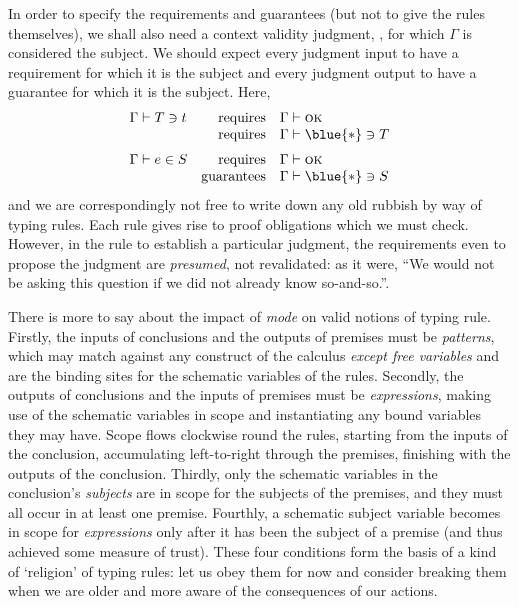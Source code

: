 \documentclass[natbib]{article}
\newcommand{\type}{\blue{\ast}}
\newcommand{\VALID}[1]{#1 \vdash \textsc{ok}}
\begin{document}
In order to specify the requirements and guarantees (but not to give the rules themselves), we shall also
need a context validity judgment, \framebox{$\VALID\Gamma$}, for which $\Gamma$ is considered the subject.
We should expect every judgment input to have a requirement for which it is the subject and every judgment output to have a guarantee for which it is the subject. Here,
\[\begin{array}{lrl}
\CHK\Gamma Tt & \mbox{requires} & \VALID\Gamma \\
              & \mbox{requires} & \CHK\Gamma \type T \medskip \\
\SYN\Gamma eS & \mbox{requires} & \VALID\Gamma \\
              & \mbox{guarantees} & \CHK\Gamma \type S
\end{array}\]
and we are correspondingly not free to write down any old rubbish by way of typing rules. Each rule gives
rise to proof obligations which we must check. However, in the rule to establish a particular judgment,
the requirements even to propose the judgment are \emph{presumed}, not revalidated: as it were, ``We would not be asking this question if we did not already know so-and-so.''.

There is more to say about the impact of \emph{mode} on valid notions of typing rule. Firstly, the inputs of conclusions and the outputs of premises must be \emph{patterns}, which may match against any construct of the calculus \emph{except free variables} and are the binding sites for the schematic variables of the rules.  Secondly, the outputs of conclusions and the inputs of premises must be \emph{expressions}, making use of the schematic variables in scope and instantiating any bound variables they may have. Scope flows clockwise round the rules, starting from the inputs of the conclusion, accumulating left-to-right through the premises, finishing with the outputs of the conclusion. Thirdly, only the schematic variables in the conclusion's \emph{subjects} are
in scope for the subjects of the premises, and they must all occur in at least one premise. Fourthly, a schematic subject variable becomes in scope for \emph{expressions} only after it has been the subject of a premise (and thus achieved some measure of trust). These four conditions form the basis of a kind of `religion' of typing rules: let us obey them for now and consider breaking them when we are older and more aware of the consequences of our actions.
\end{document}
